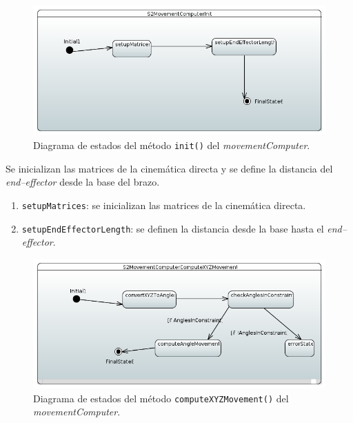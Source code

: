 \begin{figure}[H]
    \centering
    \includegraphics[width=1\linewidth]{pictures/S2MovementComputerInit.PNG}
    \caption{Diagrama de estados del método \texttt{init()} del \textit{movementComputer}.}
    \label{fig:fun_init_movement_computer}
\end{figure}

Se inicializan las matrices de la cinemática directa y se define la distancia del \textit{end--effector} desde la base del brazo.

\begin{enumerate}
    \item \texttt{setupMatrices}: se inicializan las matrices de la cinemática directa.
    \item \texttt{setupEndEffectorLength}: se definen la distancia desde la base hasta el \textit{end--effector}.
\end{enumerate}

\begin{figure}[H]
    \centering
    \includegraphics[width=1\linewidth]{pictures/S2MovementComputerComputeXYZMovement.PNG}
    \caption{Diagrama de estados del método \texttt{computeXYZMovement()} del \textit{movementComputer}.}
    \label{fig:fun_compute_xyz_movement_movement_computer}
\end{figure}

